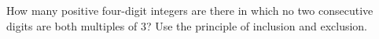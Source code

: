 How many positive four-digit integers are there in which no two consecutive digits are both multiples of $3$? Use the principle of inclusion and exclusion.
